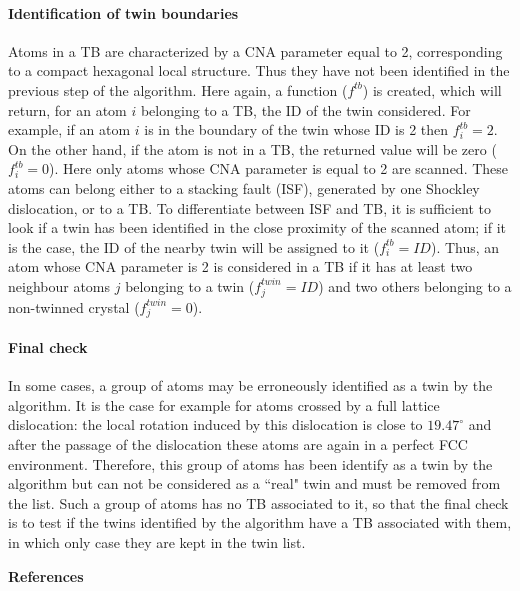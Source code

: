 \documentclass[final,3p,times,twocolumn]{elsarticle}
\begin{document}
\paragraph{Identification of twin boundaries}
Atoms in a TB are characterized by a CNA parameter equal to 2, corresponding to a compact hexagonal local structure. Thus they have not been identified in the previous step of the algorithm. Here again, a function ($ f^{tb} $) is created, which will return, for an atom $ i $ belonging to a TB, the ID of the twin considered. For example, if an atom $ i $ is in the boundary of the twin whose ID is 2 then $ f^{tb}_{i}=2 $. On the other hand, if the atom is not in a TB, the returned value will be zero ($ f^{tb}_{i}=0 $). Here only atoms whose CNA parameter is equal to 2 are scanned. These atoms can belong either to a stacking fault (ISF), generated by one Shockley dislocation, or to a TB. To differentiate between ISF and TB, it is sufficient to look if a twin has been identified in the close proximity of the scanned atom; if it is the case, the ID of the nearby twin will be assigned to it ($ f^{tb}_{i}=ID $). Thus, an atom whose CNA parameter is 2 is considered in a TB if it has at least two neighbour atoms $ j $ belonging to a twin ($ f^{twin}_{j}=ID $) and two others belonging to a non-twinned crystal ($ f^{twin}_{j}=0 $). 

\paragraph{Final check}
In some cases, a group of atoms may be erroneously identified as a twin by the algorithm. It is the case for example for atoms crossed by a full lattice dislocation: the local rotation induced by this dislocation is close to $ 19.47^{\circ} $ and after the passage of the dislocation these atoms are again in a perfect FCC environment. Therefore, this group of atoms has been identify as a twin by the algorithm but can not be considered as a ``real" twin and must be removed from the list. Such a group of atoms has no TB associated to it, so that the final check is to test if the twins identified by the algorithm have a TB associated with them, in which only case they are kept in the twin list.
\newline

\noindent\textbf{References}


\end{document}
